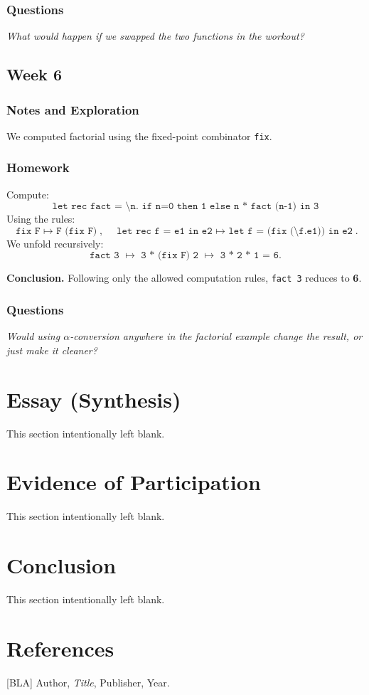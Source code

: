 \documentclass[11pt]{article}
\begin{document}
\subsubsection{Questions}
\emph{What would happen if we swapped the two functions in the workout?}

\subsection{Week 6}

\subsubsection{Notes and Exploration}
We computed factorial using the fixed-point combinator \texttt{fix}.

\subsubsection{Homework}
Compute:
\[
\texttt{let rec fact = \textbackslash n. if n=0 then 1 else n * fact (n-1) in 3}
\]
Using the rules:
\[
\texttt{fix F $\mapsto$ F (fix F)}, \quad
\texttt{let rec f = e1 in e2 $\mapsto$ let f = (fix (\textbackslash f.e1)) in e2}.
\]
We unfold recursively:
\[
\texttt{fact 3 $\mapsto$ 3 * (fix F) 2 $\mapsto$ 3 * 2 * 1 = 6}.
\]

\textbf{Conclusion.}  
Following only the allowed computation rules, \texttt{fact 3} reduces to \textbf{6}.

\subsubsection{Questions}
\emph{Would using $\alpha$-conversion anywhere in the factorial example change the result, or just make it cleaner?}

\section{Essay (Synthesis)}
This section intentionally left blank.

\section{Evidence of Participation}
This section intentionally left blank.

\section{Conclusion}
This section intentionally left blank.

\section*{References}
[BLA] Author, \emph{Title}, Publisher, Year.
\end{document}
